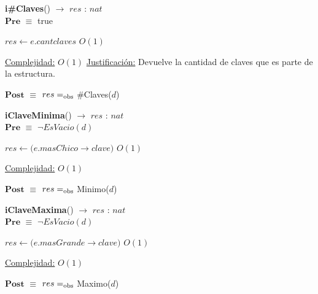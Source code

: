 \begin{algorithm}[H]{\textbf{i\#Claves}() $\to$ $res$ : $nat$}
	{\\ $\textbf{Pre}$ $\equiv$ true}
	\begin{algorithmic}[1]

		\State $res \gets e.cantclaves$ \Comment $O(1)$

		\medskip
		\Statex \underline{Complejidad:} $O(1)$
		\Statex \underline{Justificación:} Devuelve la cantidad de claves que es parte de la estructura.

    \end{algorithmic}
    {$\textbf{Post}$ $\equiv$ $res =_{\mathrm{obs}}$ \#Claves($d$)}
\end{algorithm}


\begin{algorithm}[H]{\textbf{iClaveMinima}() $\to$ $res$ : $nat$}
	{\\ $\textbf{Pre}$ $\equiv$ $\neg EsVacio(d)$}
	\begin{algorithmic}[1]

		\State $res \gets (e.masChico$$\rightarrow$$clave)$ \Comment $O(1)$

		\medskip
		\Statex \underline{Complejidad:} $O(1)$

    \end{algorithmic}
    {$\textbf{Post}$ $\equiv$ $res =_{\mathrm{obs}}$ Minimo($d$)}
\end{algorithm}


\begin{algorithm}[H]{\textbf{iClaveMaxima}() $\to$ $res$ : $nat$}
	{\\ $\textbf{Pre}$ $\equiv$ $\neg EsVacio(d)$}
	\begin{algorithmic}[1]

		\State $res \gets (e.masGrande$$\rightarrow$$clave)$ \Comment $O(1)$

		\medskip
		\Statex \underline{Complejidad:} $O(1)$

    \end{algorithmic}
    {$\textbf{Post}$ $\equiv$ $res =_{\mathrm{obs}}$ Maximo($d$)}
\end{algorithm}


